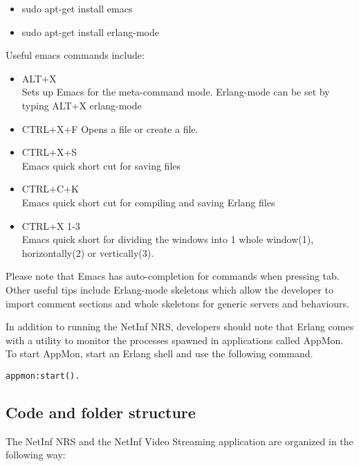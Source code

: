 \begin{itemize}
\item sudo apt-get install emacs
\item sudo apt-get install erlang-mode
\end{itemize}

Useful emacs commands include:

\begin{itemize}
\item ALT+X \\
Sets up Emacs for the meta-command mode. Erlang-mode can be set by typing
ALT+X erlang-mode
\item CTRL+X+F
Opens a file or create a file. 
\item CTRL+X+S \\
Emacs quick short cut for saving files
\item CTRL+C+K \\
Emacs quick short cut for compiling and saving Erlang files
\item CTRL+X 1-3 \\
Emacs quick short for dividing the windows into 1 whole window(1), horizontally(2) or vertically(3).
\end{itemize}

Please note that Emacs has auto-completion for commands when pressing tab. Other useful tips include Erlang-mode 
skeletons which allow the developer to import comment sections and whole skeletons for generic servers and behaviours.

In addition to running the NetInf NRS, developers should note that Erlang comes with a utility to monitor the processes 
spawned in applications called AppMon. To start AppMon, start an Erlang shell and use the following command.

\begin{verbatim}
appmon:start(). 
\end{verbatim}


\subsection {Code and folder structure}

The NetInf NRS and the NetInf Video Streaming application are organized in the following way:

